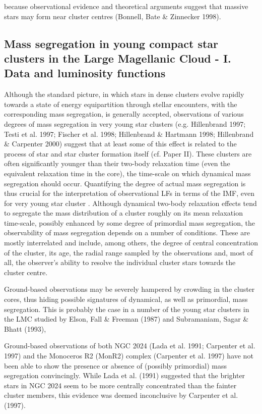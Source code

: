 \documentclass[../Main.tex]{subfiles}
\begin{document}
 because observational evidence and theoretical arguments suggest that massive stars may form near cluster centres (Bonnell, Bate & Zinnecker 1998).

\subsection{Mass segregation in young compact star clusters in the Large Magellanic Cloud - I. Data and luminosity functions}


Although the standard picture, in which stars in dense clusters
evolve rapidly towards a state of energy equipartition through
stellar encounters, with the corresponding mass segregation, is
generally accepted, observations of various degrees of mass
segregation in very young star clusters (e.g. Hillenbrand 1997;
Testi et al. 1997; Fischer et al. 1998; Hillenbrand & Hartmann
1998; Hillenbrand & Carpenter 2000) suggest that at least some of this effect is related to the process of star and star cluster formation
itself (cf. Paper II). These clusters are often significantly younger
than their two-body relaxation time (even the equivalent relaxation
time in the core), the time-scale on which dynamical mass
segregation should occur. Quantifying the degree of actual mass
segregation is thus crucial for the interpretation of observational
LFs in terms of the IMF, even for very young star cluster .
Although dynamical two-body relaxation effects tend to
segregate the mass distribution of a cluster roughly on its mean
relaxation time-scale, possibly enhanced by some degree of
primordial mass segregation, the observability of mass segregation
depends on a number of conditions. These are mostly interrelated
and include, among others, the degree of central concentration of
the cluster, its age, the radial range sampled by the observations
and, most of all, the observer’s ability to resolve the individual
cluster stars towards the cluster centre.

Ground-based observations may be severely
hampered by crowding in the cluster cores, thus hiding possible
signatures of dynamical, as well as primordial, mass segregation.
This is probably the case in a number of the young star clusters in
the LMC studied by Elson, Fall & Freeman (1987) and
Subramaniam, Sagar & Bhatt (1993), 

Ground-based observations of both NGC 2024 (Lada et al. 1991;
Carpenter et al. 1997) and the Monoceros R2 (MonR2) complex
(Carpenter et al. 1997) have not been able to show the presence or
absence of (possibly primordial) mass segregation convincingly.
While Lada et al. (1991) suggested that the brighter stars in NGC
2024 seem to be more centrally concentrated than the fainter
cluster members, this evidence was deemed inconclusive by
Carpenter et al. (1997). 
\end{document}
